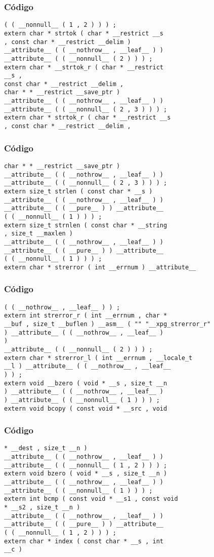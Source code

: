 \documentclass{beamer}
\begin{document}
\begin{frame}[fragile]
\frametitle{C\'odigo}
\begin{verbatim}
( ( __nonnull__ ( 1 , 2 ) ) ) ; 
extern char * strtok ( char * __restrict __s 
, const char * __restrict __delim ) 
__attribute__ ( ( __nothrow__ , __leaf__ ) ) 
__attribute__ ( ( __nonnull__ ( 2 ) ) ) ; 
extern char * __strtok_r ( char * __restrict 
__s , 
const char * __restrict __delim , 
char * * __restrict __save_ptr ) 
__attribute__ ( ( __nothrow__ , __leaf__ ) ) 
__attribute__ ( ( __nonnull__ ( 2 , 3 ) ) ) ; 
extern char * strtok_r ( char * __restrict __s 
, const char * __restrict __delim , 
\end{verbatim}
\end{frame}
\begin{frame}[fragile]
\frametitle{C\'odigo}
\begin{verbatim}
char * * __restrict __save_ptr ) 
__attribute__ ( ( __nothrow__ , __leaf__ ) ) 
__attribute__ ( ( __nonnull__ ( 2 , 3 ) ) ) ; 
extern size_t strlen ( const char * __s ) 
__attribute__ ( ( __nothrow__ , __leaf__ ) ) 
__attribute__ ( ( __pure__ ) ) __attribute__ 
( ( __nonnull__ ( 1 ) ) ) ; 
extern size_t strnlen ( const char * __string 
, size_t __maxlen ) 
__attribute__ ( ( __nothrow__ , __leaf__ ) ) 
__attribute__ ( ( __pure__ ) ) __attribute__ 
( ( __nonnull__ ( 1 ) ) ) ; 
extern char * strerror ( int __errnum ) __attribute__ 
\end{verbatim}
\end{frame}
\begin{frame}[fragile]
\frametitle{C\'odigo}
\begin{verbatim}
( ( __nothrow__ , __leaf__ ) ) ; 
extern int strerror_r ( int __errnum , char * 
__buf , size_t __buflen ) __asm__ ( "" "__xpg_strerror_r" 
) __attribute__ ( ( __nothrow__ , __leaf__ ) 
) 
__attribute__ ( ( __nonnull__ ( 2 ) ) ) ; 
extern char * strerror_l ( int __errnum , __locale_t 
__l ) __attribute__ ( ( __nothrow__ , __leaf__ 
) ) ; 
extern void __bzero ( void * __s , size_t __n 
) __attribute__ ( ( __nothrow__ , __leaf__ ) 
) __attribute__ ( ( __nonnull__ ( 1 ) ) ) ; 
extern void bcopy ( const void * __src , void 
\end{verbatim}
\end{frame}
\begin{frame}[fragile]
\frametitle{C\'odigo}
\begin{verbatim}
* __dest , size_t __n ) 
__attribute__ ( ( __nothrow__ , __leaf__ ) ) 
__attribute__ ( ( __nonnull__ ( 1 , 2 ) ) ) ; 
extern void bzero ( void * __s , size_t __n ) 
__attribute__ ( ( __nothrow__ , __leaf__ ) ) 
__attribute__ ( ( __nonnull__ ( 1 ) ) ) ; 
extern int bcmp ( const void * __s1 , const void 
* __s2 , size_t __n ) 
__attribute__ ( ( __nothrow__ , __leaf__ ) ) 
__attribute__ ( ( __pure__ ) ) __attribute__ 
( ( __nonnull__ ( 1 , 2 ) ) ) ; 
extern char * index ( const char * __s , int 
__c ) 
\end{verbatim}
\end{frame}
\end{document}
